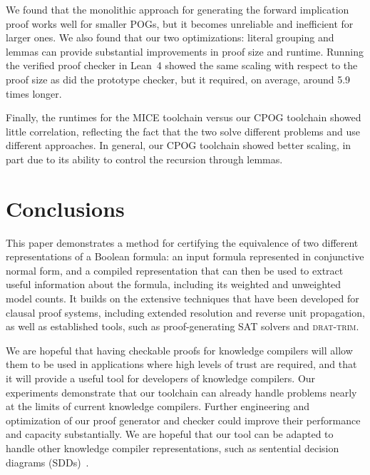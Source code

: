 \documentclass[letterpaper,USenglish,cleveref, autoref, thm-restate]{lipics-v2021}
\newcommand{\progname}[1]{\textsc{#1}}
\newcommand{\dtrim}{\progname{drat-trim}}
\newcommand{\lean}{Lean~4}
\begin{document}
We found that the monolithic approach for generating the forward
implication proof works well for smaller POGs, but it becomes
unreliable and inefficient for larger ones.
We also found that our two optimizations: literal grouping and
lemmas can provide substantial improvements in proof size and runtime.
Running the verified proof checker in \lean{} showed the same scaling
with respect to the proof size as did the prototype checker, but it
required, on average, around 5.9 times longer.

Finally, the runtimes for the MICE toolchain versus our CPOG toolchain
showed little correlation, reflecting the fact that the two solve
different problems and use different approaches.  In general,
our CPOG toolchain showed better scaling, in part due to its ability
to control the recursion through lemmas.

\section{Conclusions}
\label{sect:future}

This paper demonstrates a method for certifying the equivalence of two
different representations of a Boolean formula: an input formula
represented in conjunctive normal form, and a compiled representation
that can then be used to extract useful information about the formula,
including its weighted and unweighted model counts.  It builds on the
extensive techniques that have been developed for clausal
proof systems, including extended resolution and reverse unit propagation, as well as established tools, such as
proof-generating SAT solvers and \dtrim{}.


We are hopeful that having checkable proofs for knowledge compilers
will allow them to be used in applications where high levels of trust
are required, and that it will provide a useful tool for developers of
knowledge compilers.
Our experiments demonstrate that our toolchain can already handle
problems nearly at the limits of current knowledge compilers.  Further
engineering and optimization of our proof generator and checker could
improve their performance and capacity substantially.  We are hopeful
that our tool can be adapted to handle other knowledge compiler
representations, such as sentential decision diagrams (SDDs)~\cite{darwiche:ijcai:2011}.
\end{document}
